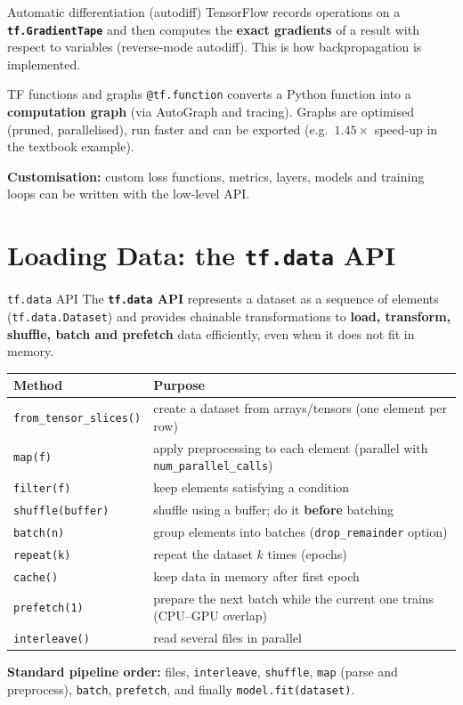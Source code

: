 \begin{dfn}{Automatic differentiation (autodiff)}
TensorFlow records operations on a \textbf{\texttt{tf.GradientTape}} and then computes the \textbf{exact gradients} of a result with respect to variables (reverse-mode autodiff). This is how backpropagation is implemented.
\end{dfn}
\begin{dfn}{TF functions and graphs}
\texttt{@tf.function} converts a Python function into a \textbf{computation graph} (via AutoGraph and tracing). Graphs are optimised (pruned, parallelised), run faster and can be exported (e.g.\ $1.45\times$ speed-up in the textbook example).
\end{dfn}
\textbf{Customisation:} custom loss functions, metrics, layers, models and training loops can be written with the low-level API.

\section{Loading Data: the \texttt{tf.data} API}
\begin{dfn}{\texttt{tf.data} API}
The \textbf{\texttt{tf.data} API} represents a dataset as a sequence of elements (\texttt{tf.data.Dataset}) and provides chainable transformations to \textbf{load, transform, shuffle, batch and prefetch} data efficiently, even when it does not fit in memory.
\end{dfn}
\begin{center}
\small
\begin{tabular}{@{}p{4.4cm}p{11.9cm}@{}}
\toprule
\textbf{Method} & \textbf{Purpose}\\
\midrule
\texttt{from\_tensor\_slices()} & create a dataset from arrays/tensors (one element per row)\\
\texttt{map(f)} & apply preprocessing to each element (parallel with \texttt{num\_parallel\_calls})\\
\texttt{filter(f)} & keep elements satisfying a condition\\
\texttt{shuffle(buffer)} & shuffle using a buffer; do it \textbf{before} batching\\
\texttt{batch(n)} & group elements into batches (\texttt{drop\_remainder} option)\\
\texttt{repeat(k)} & repeat the dataset $k$ times (epochs)\\
\texttt{cache()} & keep data in memory after first epoch\\
\texttt{prefetch(1)} & prepare the next batch while the current one trains (CPU--GPU overlap)\\
\texttt{interleave()} & read several files in parallel\\
\bottomrule
\end{tabular}
\end{center}
\textbf{Standard pipeline order:} files, \texttt{interleave}, \texttt{shuffle}, \texttt{map} (parse and preprocess), \texttt{batch}, \texttt{prefetch}, and finally \texttt{model.fit(dataset)}.

